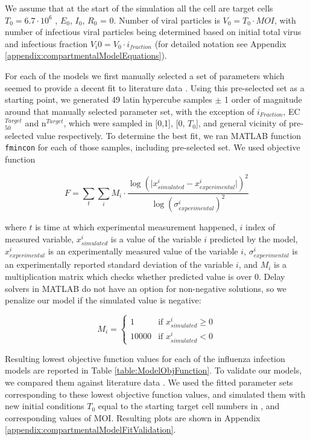 We assume that at the start of the simulation all the cell are target cells $T_0 = 6.7 \cdot 10^6$ \cite{saenz2010dynamics}, $E_0$, $I_0$, $R_0$ = 0. Number of viral particles is $V_0 = T_0 \cdot MOI$, with number of infectious viral particles being determined based on initial total virus and infectious fraction $V_i0 = V_0 \cdot i_{fraction}$ (for detailed notation see Appendix \ref{appendix:compartmentalModelEquations}).

For each of the models we first manually selected a set of parameters which seemed to provide a decent fit to literature data \cite{rudiger2019multiscale}. Using this pre-selected set as a starting point, we generated 49 latin hypercube samples $\pm$ 1 order of magnitude around that manually selected parameter set, with the exception of $i_{Fraction}$, EC$_{50}^{Target}$ and n$^{Target}$, which were sampled in [0,1], [0, $T_0$], and general vicinity of pre-selected value respectively. To determine the best fit, we ran MATLAB function \texttt{fmincon} for each of those samples, including pre-selected set. We used objective function

\begin{equation}
F = \sum_t \sum_i M_i \cdot \frac{\log (\big| x^i_{simulated} - x^i_{experimental} \big|)^2}{\log (\sigma^i_{experimental})^2}
\end{equation}

where $t$ is time at which experimental measurement happened, $i$ index of measured variable, $x^i_{simulated}$ is a value of the variable $i$ predicted by the model, $x^i_{experimental}$ is an experimentally measured value of the variable $i$, $\sigma^i_{experimental}$ is an experimentally reported standard deviation of the variable $i$, and $M_i$ is a multiplication matrix which checks whether predicted value is over 0. Delay solvers in MATLAB do not have an option for non-negative solutions, so we penalize our model if the simulated value is negative:

\begin{equation}
M_i =
\begin{cases}
1 & \mbox{if } x^i_{simulated} \ge 0\\
10000 & \mbox{if } x^i_{simulated} < 0
\end{cases}
\end{equation}

Resulting lowest objective function values for each of the influenza infection models are reported in Table \ref{table:ModelObjFunction}. To validate our models, we compared them against literature data \cite{schulze2009infection}. We used the fitted parameter sets corresponding to these lowest objective function values, and simulated them with new initial conditions $T_0$ equal to the starting target cell numbers in \cite{schulze2009infection}, and corresponding values of MOI. Resulting plots are shown in Appendix \ref{appendix:compartmentalModelFitValidation}.

